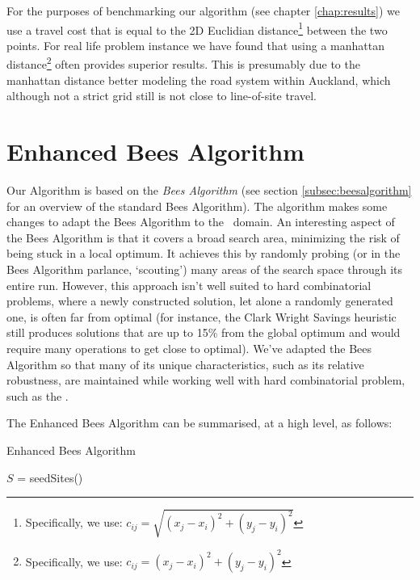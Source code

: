 For the purposes of benchmarking our algorithm (see chapter \ref{chap:results}) we use a travel cost that is equal to the 2D Euclidian distance\footnote{Specifically, we use: $c_{ij} = \sqrt{(x_j-x_i)^2 + (y_j-y_i)^2}$} between the two points. For real life problem instance we have found that using a manhattan distance\footnote{Specifically, we use: $c_{ij} = (x_j-x_i)^2 + (y_j-y_i)^2$} often provides superior results. This is presumably due to the manhattan distance better modeling the road system within Auckland, which although not a strict grid still is not close to line-of-site travel.

\section{Enhanced Bees Algorithm}
\label{sec:enhancedbeesalgorithm}

Our Algorithm is based on the \emph{Bees Algorithm} (see section \ref{subsec:beesalgorithm} for an overview of the standard Bees Algorithm). The algorithm makes some changes to adapt the Bees Algorithm to the \VRP\ domain. An interesting aspect of the Bees Algorithm is that it covers a broad search area, minimizing the risk of being stuck in a local optimum. It achieves this by randomly probing (or in the Bees Algorithm parlance, `scouting') many areas of the search space through its entire run. However, this approach isn't well suited to hard combinatorial problems, where a newly constructed solution, let alone a randomly generated one, is often far from optimal (for instance, the Clark Wright Savings heuristic still produces solutions that are up to 15\% from the global optimum and would require many operations to get close to optimal). We've adapted the Bees Algorithm so that many of its unique characteristics, such as its relative robustness, are maintained while working well with hard combinatorial problem, such as the \VRP.

The Enhanced Bees Algorithm can be summarised, at a high level, as follows:

\begin{algorithm}[H]
   \caption{Enhanced Bees Algorithm}
   $S$ = seedSites() \\

\end{algorithm}

